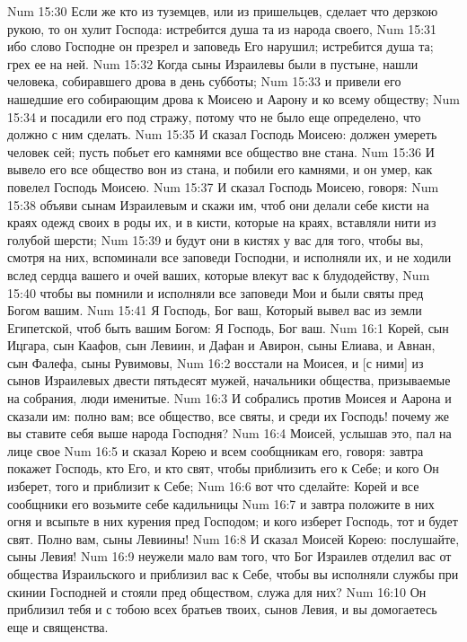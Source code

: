 Num 15:30  Если же кто из туземцев, или из пришельцев, сделает что дерзкою рукою, то он хулит Господа: истребится душа та из народа своего,
Num 15:31  ибо слово Господне он презрел и заповедь Его нарушил; истребится душа та; грех ее на ней.
Num 15:32  Когда сыны Израилевы были в пустыне, нашли человека, собиравшего дрова в день субботы;
Num 15:33  и привели его нашедшие его собирающим дрова к Моисею и Аарону и ко всему обществу;
Num 15:34  и посадили его под стражу, потому что не было еще определено, что должно с ним сделать.
Num 15:35  И сказал Господь Моисею: должен умереть человек сей; пусть побьет его камнями все общество вне стана.
Num 15:36  И вывело его все общество вон из стана, и побили его камнями, и он умер, как повелел Господь Моисею.
Num 15:37  И сказал Господь Моисею, говоря:
Num 15:38  объяви сынам Израилевым и скажи им, чтоб они делали себе кисти на краях одежд своих в роды их, и в кисти, которые на краях, вставляли нити из голубой шерсти;
Num 15:39  и будут они в кистях у вас для того, чтобы вы, смотря на них, вспоминали все заповеди Господни, и исполняли их, и не ходили вслед сердца вашего и очей ваших, которые влекут вас к блудодейству,
Num 15:40  чтобы вы помнили и исполняли все заповеди Мои и были святы пред Богом вашим.
Num 15:41  Я Господь, Бог ваш, Который вывел вас из земли Египетской, чтоб быть вашим Богом: Я Господь, Бог ваш.
Num 16:1  Корей, сын Ицгара, сын Каафов, сын Левиин, и Дафан и Авирон, сыны Елиава, и Авнан, сын Фалефа, сыны Рувимовы,
Num 16:2  восстали на Моисея, и [с ними] из сынов Израилевых двести пятьдесят мужей, начальники общества, призываемые на собрания, люди именитые.
Num 16:3  И собрались против Моисея и Аарона и сказали им: полно вам; все общество, все святы, и среди их Господь! почему же вы ставите себя выше народа Господня?
Num 16:4  Моисей, услышав это, пал на лице свое
Num 16:5  и сказал Корею и всем сообщникам его, говоря: завтра покажет Господь, кто Его, и кто свят, чтобы приблизить его к Себе; и кого Он изберет, того и приблизит к Себе;
Num 16:6  вот что сделайте: Корей и все сообщники его возьмите себе кадильницы
Num 16:7  и завтра положите в них огня и всыпьте в них курения пред Господом; и кого изберет Господь, тот и будет свят. Полно вам, сыны Левиины!
Num 16:8  И сказал Моисей Корею: послушайте, сыны Левия!
Num 16:9  неужели мало вам того, что Бог Израилев отделил вас от общества Израильского и приблизил вас к Себе, чтобы вы исполняли службы при скинии Господней и стояли пред обществом, служа для них?
Num 16:10  Он приблизил тебя и с тобою всех братьев твоих, сынов Левия, и вы домогаетесь еще и священства.
